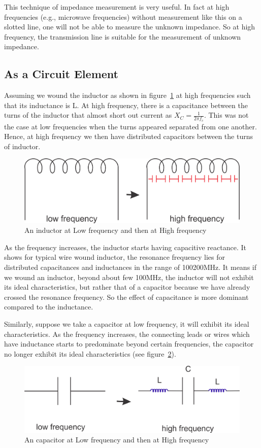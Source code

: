 This technique of impedance measurement is very useful. In fact at high frequencies (e.g., microwave frequencies) without measurement like this on a slotted line, one will not be able to measure the unknown impedance. So at high frequency, the transmission line is suitable for the measurement of unknown impedance.

\subsection{As a Circuit Element}
Assuming we wound the inductor as shown in figure~\ref{fig:group10diagram3} at high frequencies such that its inductance is L. At high frequency, there is a capacitance between the turns of the inductor that almost short out current as $X_{C} = \frac{1}{2\pi f_c}$. This was not the case at low frequencies when the turns appeared separated from one another. Hence, at high frequency we then have distributed capacitors between the turns of inductor.
\begin{figure}[h]
\centering
\includegraphics[width=1\linewidth]{./graphics/group10diagram3}
\caption{An inductor at Low frequency and then at High frequency}
\label{fig:group10diagram3}
\end{figure}

As the frequency increases, the inductor starts having capacitive reactance. It shows for typical wire wound inductor, the resonance frequency lies for distributed capacitances and inductances in the range of 100\textemdash\;200MHz. It means if we wound an inductor, beyond about few 100MHz, the inductor will not exhibit its ideal characteristics, but rather that of a capacitor because we have already crossed the resonance frequency. So the effect of capacitance is more dominant compared to the inductance.

Similarly, suppose we take a capacitor at low frequency, it will exhibit its ideal characteristics. As the frequency increases, the connecting leads or wires which have inductance starts to predominate beyond certain frequencies, the capacitor no longer exhibit its ideal characteristics (see figure~\ref{fig:group10diagram4}).
\begin{figure}[h]
\centering
\includegraphics[width=1\linewidth]{./graphics/group10diagram4}
\caption{An capacitor at Low frequency and then at High frequency}
\label{fig:group10diagram4}
\end{figure}

